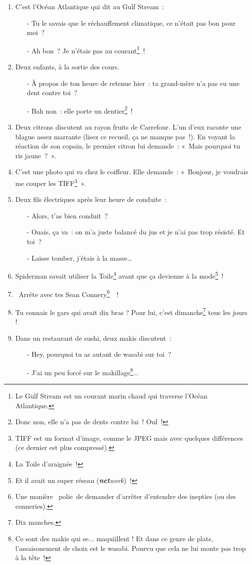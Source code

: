 \documentclass[10pt,a5paper,fullpage]{book}
\begin{document}
\begin{enumerate}
		\item C’est l’Océan Atlantique qui dit au Gulf Stream~:
		\begin{itemize}	
			\item[-] Tu le savais que le réchauffement climatique, ce n’était pas bon pour moi~?
			\item[-] Ah bon~? Je n’étais pas au courant\footnote{Le Gulf Stream est un courant marin chaud qui traverse l’Océan Atlantique.}~!
		\end{itemize}
		\item Deux enfants, à la sortie des cours. 
		\begin{itemize}
			\item[-] À propos de ton heure de retenue hier~: ta grand-mère n’a pas eu une dent contre toi~?
			\item[-] Bah non~: elle porte un dentier\footnote{Donc non, elle n'a pas de dents contre lui~! Ouf~!}~!  
		\end{itemize}
		\item Deux citrons discutent au rayon fruits de Carrefour. L’un d’eux raconte une blague assez marrante (lisez ce recueil, ça ne manque pas~!). En voyant la réaction de son copain, le premier citron lui demande~: «~Mais pourquoi tu ris jaune~?~».
		\item C’est une photo qui va chez le coiffeur. Elle demande~: «~Bonjour, je voudrais me couper les TIFF\footnote{TIFF est un format d’image, comme le JPEG mais avec quelques différences (ce dernier est plus compressé).}~».
		\item Deux fils électriques après leur heure de conduite~: 
		\begin{itemize}
			\item[-] Alors, t’as bien conduit~?
			\item[-] Ouais, ça va~: on m’a juste balancé du jus et je n’ai pas trop résisté. Et toi~?
			\item[-] Laisse tomber, j’étais à la masse… 
		\end{itemize}
		\item Spiderman savait utiliser la Toile\footnote{La Toile d’araignée~!} avant que ça devienne à la mode\footnote{Et il avait un super réseau (\textit{\textbf{net}work})~!}~!
		\item \guillemotleft~Arrête avec tes Sean Connery\footnote{Une manière \guillemotleft~polie~\guillemotright de demander d'arrêter d'entendre des inepties (ou des conneries).}~\guillemotright~!
		\item Tu connais le gars qui avait dix bras ? Pour lui, c'est dimanche\footnote{Dix manches.} tous les jours !
		\item Dans un restaurant de sushi, deux makis discutent~:
		\begin{itemize}
			\item[-] Hey, pourquoi tu as autant de wasabi sur toi~?
			\item[-] J'ai un peu forcé sur le makillage\footnote{Ce sont des makis qui se... maquiillent ! Et dans ce genre de plats, l'assaisonement de choix est le wasabi. Pourvu que cela ne lui monte pas trop à la tête~!}...
		\end{itemize}
	\end{enumerate}
	
\end{document}
